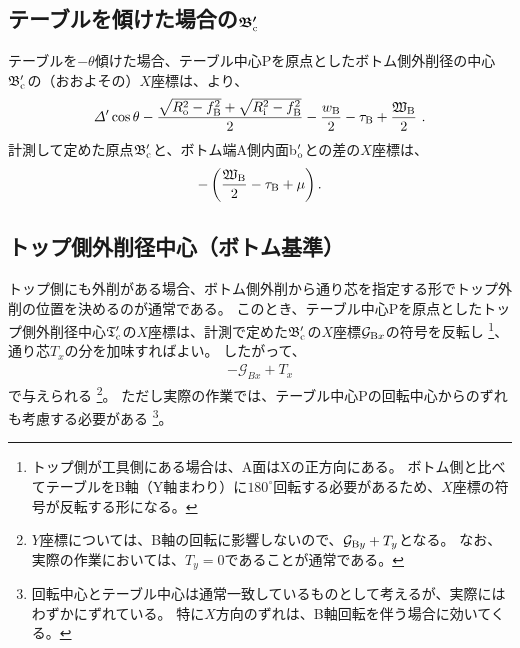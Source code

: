 \subsection[テーブルを傾けた場合の$\mathfrak B_\text c'$]
           {テーブルを傾けた場合の$\boldsymbol{\mathfrak B_\text c'}$}
テーブルを$-\theta$傾けた場合、テーブル中心Pを原点としたボトム側外削径の中心$\mathfrak B_\text c'$の（おおよその）$X$座標は、より、
\begin{align*}
  \varDelta'\cos\theta-\frac{\sqrt{R_\text o^2-f_\text B^2}+\sqrt{R_\text i^2-f_\text B^2}}2
  -\frac{w_\text B}2-\tau_\text B+\frac{\mathfrak W_\text B}2\ .
\end{align*}
計測して定めた原点$\mathfrak B_\text c'$と、ボトム端A側内面b$_\text o'$との差の$X$座標は、
\begin{align*}
  -\left(\frac{\mathfrak W_\text B}2-\tau_\text B+\mu\right).
\end{align*}


\subsection{トップ側外削径中心（ボトム基準）}
トップ側にも外削がある場合、ボトム側外削から通り芯を指定する形でトップ外削の位置を決めるのが通常である。
このとき、テーブル中心Pを原点としたトップ側外削径中心$\mathfrak T_\text c'$の$X$座標は、計測で定めた$\mathfrak B_\text c'$の$X$座標$\mathcal G_{\text Bx}$の符号を反転し
\footnote{トップ側が工具側にある場合は、A面はXの正方向にある。
ボトム側と比べてテーブルをB軸（Y軸まわり）に$180^\circ$回転する必要があるため、$X$座標の符号が反転する形になる。}、
通り芯$T_x$の分を加味すればよい。
したがって、
\begin{align*}
  -\mathcal G_{Bx}+T_x
\end{align*}
で与えられる
\footnote{$Y$座標については、B軸の回転に影響しないので、$\mathcal G_{\text By}+T_y$となる。
なお、実際の作業においては、$T_y = 0$であることが通常である。}。
ただし実際の作業では、テーブル中心Pの回転中心からのずれも考慮する必要がある
\footnote{回転中心とテーブル中心は通常一致しているものとして考えるが、実際にはわずかにずれている。
特に$X$方向のずれは、B軸回転を伴う場合に効いてくる。}。



